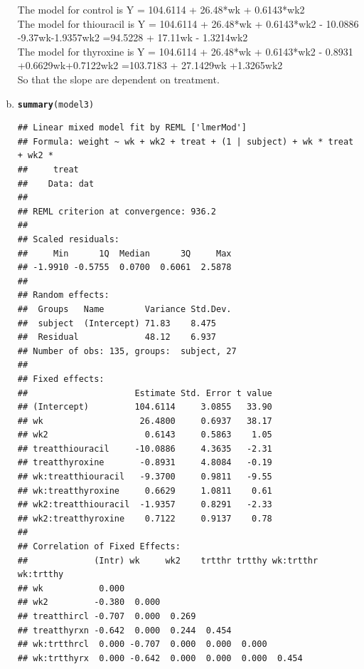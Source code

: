 \documentclass{article}\usepackage[]{graphicx}\usepackage[]{color}
\makeatletter
\newcommand{\hlstd}[1]{\textcolor[rgb]{0.345,0.345,0.345}{#1}}%
\newcommand{\hlkwd}[1]{\textcolor[rgb]{0.737,0.353,0.396}{\textbf{#1}}}%
\newenvironment{kframe}{%
 \def\at@end@of@kframe{}%
 \ifinner\ifhmode%
  \def\at@end@of@kframe{\end{minipage}}%
  \begin{minipage}{\columnwidth}%
 \fi\fi%
 \def\FrameCommand##1{\hskip\@totalleftmargin \hskip-\fboxsep
 \colorbox{shadecolor}{##1}\hskip-\fboxsep
     \hskip-\linewidth \hskip-\@totalleftmargin \hskip\columnwidth}%
 \MakeFramed {\advance\hsize-\width
   \@totalleftmargin\z@ \linewidth\hsize
   \@setminipage}}%
 {\par\unskip\endMakeFramed%
 \at@end@of@kframe}
\newenvironment{knitrout}{}{} %
\makeatother
\begin{document}
\begin{enumerate}[(a)]
\qquad The model for control is Y = 104.6114 + 26.48*wk + 0.6143*wk2  \\
\qquad The model for thiouracil is Y = 104.6114 + 26.48*wk + 0.6143*wk2  - 10.0886 -9.37wk-1.9357wk2 =94.5228 + 17.11wk - 1.3214wk2 \\
\qquad The model for thyroxine is Y = 104.6114 + 26.48*wk + 0.6143*wk2  - 0.8931 +0.6629wk+0.7122wk2 =103.7183 + 27.1429wk +1.3265wk2 \\

So that the slope are dependent on treatment.

\item

\begin{knitrout}
\color{fgcolor}\begin{kframe}
\begin{alltt}
  \hlkwd{summary}\hlstd{(model3)}
\end{alltt}
\begin{verbatim}
## Linear mixed model fit by REML ['lmerMod']
## Formula: weight ~ wk + wk2 + treat + (1 | subject) + wk * treat + wk2 *  
##     treat
##    Data: dat
## 
## REML criterion at convergence: 936.2
## 
## Scaled residuals: 
##     Min      1Q  Median      3Q     Max 
## -1.9910 -0.5755  0.0700  0.6061  2.5878 
## 
## Random effects:
##  Groups   Name        Variance Std.Dev.
##  subject  (Intercept) 71.83    8.475   
##  Residual             48.12    6.937   
## Number of obs: 135, groups:  subject, 27
## 
## Fixed effects:
##                     Estimate Std. Error t value
## (Intercept)         104.6114     3.0855   33.90
## wk                   26.4800     0.6937   38.17
## wk2                   0.6143     0.5863    1.05
## treatthiouracil     -10.0886     4.3635   -2.31
## treatthyroxine       -0.8931     4.8084   -0.19
## wk:treatthiouracil   -9.3700     0.9811   -9.55
## wk:treatthyroxine     0.6629     1.0811    0.61
## wk2:treatthiouracil  -1.9357     0.8291   -2.33
## wk2:treatthyroxine    0.7122     0.9137    0.78
## 
## Correlation of Fixed Effects:
##             (Intr) wk     wk2    trtthr trtthy wk:trtthr wk:trtthy
## wk           0.000                                                
## wk2         -0.380  0.000                                         
## treatthircl -0.707  0.000  0.269                                  
## treatthyrxn -0.642  0.000  0.244  0.454                           
## wk:trtthrcl  0.000 -0.707  0.000  0.000  0.000                    
## wk:trtthyrx  0.000 -0.642  0.000  0.000  0.000  0.454             

\end{verbatim}
\end{kframe}
\end{knitrout}
\end{enumerate}
\end{document}
